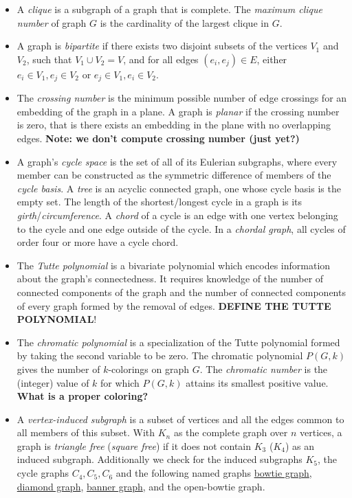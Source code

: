 \documentclass[12pt]{article}
\newcommand{\bowtiegraph}{\href{http://mathworld.wolfram.com/ButterflyGraph.html}{bowtie graph}}
\newcommand{\diamondgraph}{\href{http://mathworld.wolfram.com/DiamondGraph.html}{diamond graph}}
\newcommand{\bannergraph}{\href{http://mathworld.wolfram.com/BannerGraph.html}{banner graph}}
\begin{document}
\begin{itemize}
\item A \textit{clique} is a subgraph of a graph that is complete. The \textit{maximum clique number} of graph $G$ is the cardinality of the largest clique in $G$. 

\item A graph is \textit{bipartite} if there exists two disjoint subsets of the vertices $V_1$ and $V_2$, such that $V_1 \cup V_2 = V$, and for all edges $(e_i,e_j) \in E$,  either $e_i \in V_1, e_j \in V_2$ or $e_j \in V_1, e_i \in V_2$. 

\item The \textit{crossing number} is the minimum possible number of edge crossings for an embedding of the graph in a plane.
A graph is \textit{planar} if the crossing number is zero, that is there exists an embedding in the plane with no overlapping edges.
\textbf{Note: we don't compute crossing number (just yet?)}

\item A graph's \textit{cycle space} is the set of all of its Eulerian subgraphs, where every member can be constructed as the symmetric difference of members of the \textit{cycle basis}. 
A \textit{tree} is an acyclic connected graph, one whose cycle basis is the empty set.
The length of the shortest/longest cycle in a graph is its \textit{girth}/\textit{circumference}.
A \textit{chord} of a cycle is an edge with one vertex belonging to the cycle and one edge outside of the cycle.
In a \textit{chordal graph}, all cycles of order four or more have a cycle chord.   
 
\item The \textit{Tutte polynomial} is a bivariate polynomial which encodes information about the graph's connectedness. 
It requires knowledge of the number of connected components of the graph and the number of connected components of every graph formed by the removal of edges. 
\textbf{DEFINE THE TUTTE POLYNOMIAL}!

\item The \textit{chromatic polynomial} is a specialization of the Tutte polynomial formed by taking the second variable to be zero. 
The chromatic polynomial $P(G,k)$ gives the number of $k$-colorings on graph $G$. 
The \textit{chromatic number} is the (integer) value of $k$ for which $P(G,k)$ attains its smallest positive value. 
\textbf{What is a proper coloring?}

\item A \textit{vertex-induced subgraph} is a subset of vertices and all the edges common to all members of this subset. 
With $K_n$ as the complete graph over $n$ vertices, a graph is \textit{triangle free} (\textit{square free}) if it does not contain $K_3$ ($K_4$) as an induced subgraph.
Additionally we check for the induced subgraphs $K_5$, the cycle graphs $C_4, C_5, C_6$ and the following named graphs \bowtiegraph, \diamondgraph, \bannergraph, and the open-bowtie graph. 


\end{itemize}
\end{document}

